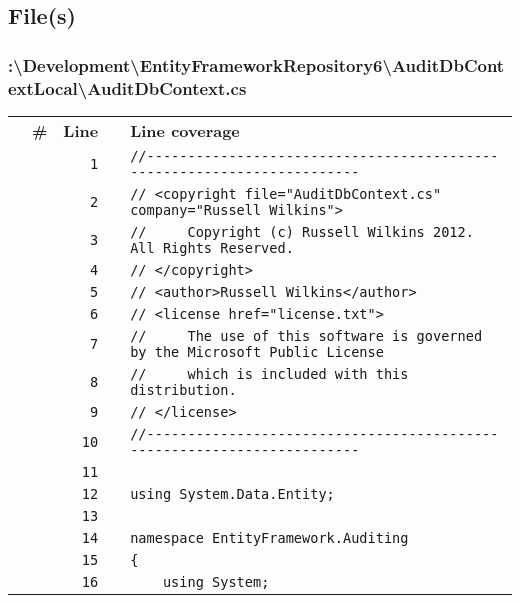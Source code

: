 \documentclass[a4paper,10pt]{article}
\begin{document}
\subsection{File(s)}
\subsubsection{:\textbackslash Development\textbackslash EntityFrameworkRepository6\textbackslash AuditDbContextLocal\textbackslash AuditDbContext.cs}
\begin{longtable}[l]{lrrll}
\textbf{} & \textbf{\#} & \textbf{Line} & \textbf{} & \textbf{Line coverage}\\
\cellcolor{gray} &  & \verb~1~ & & \verb~//-----------------------------------------------------------------------~\\
\cellcolor{gray} &  & \verb~2~ & & \verb~// <copyright file="AuditDbContext.cs" company="Russell Wilkins">~\\
\cellcolor{gray} &  & \verb~3~ & & \verb~//     Copyright (c) Russell Wilkins 2012. All Rights Reserved.~\\
\cellcolor{gray} &  & \verb~4~ & & \verb~// </copyright>~\\
\cellcolor{gray} &  & \verb~5~ & & \verb~// <author>Russell Wilkins</author>~\\
\cellcolor{gray} &  & \verb~6~ & & \verb~// <license href="license.txt">~\\
\cellcolor{gray} &  & \verb~7~ & & \verb~//     The use of this software is governed by the Microsoft Public License~\\
\cellcolor{gray} &  & \verb~8~ & & \verb~//     which is included with this distribution.~\\
\cellcolor{gray} &  & \verb~9~ & & \verb~// </license>~\\
\cellcolor{gray} &  & \verb~10~ & & \verb~//-----------------------------------------------------------------------~\\
\cellcolor{gray} &  & \verb~11~ & & \verb~~\\
\cellcolor{gray} &  & \verb~12~ & & \verb~using System.Data.Entity;~\\
\cellcolor{gray} &  & \verb~13~ & & \verb~~\\
\cellcolor{gray} &  & \verb~14~ & & \verb~namespace EntityFramework.Auditing~\\
\cellcolor{gray} &  & \verb~15~ & & \verb~{~\\
\cellcolor{gray} &  & \verb~16~ & & \verb~    using System;~\\

\end{longtable}
\end{document}
